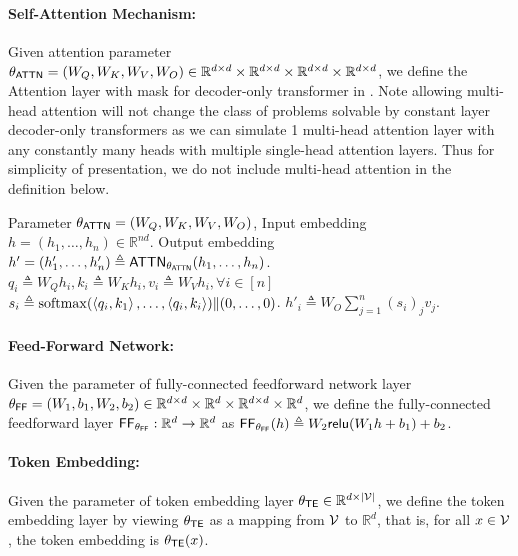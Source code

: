 \paragraph{Self-Attention Mechanism:} Given attention parameter $\theta_{\mathsf{ATTN}} = (W_Q,W_K,W_V,W_O)\in \mathbb{R}^{d\times d}\times \mathbb{R}^{d\times d}\times\mathbb{R}^{d\times d}\times \mathbb{R}^{d\times d}$, we define the Attention layer with mask for decoder-only transformer in . Note allowing multi-head attention will not change the class of problems solvable by constant layer decoder-only transformers as we can simulate 1 multi-head attention layer with any constantly many heads with multiple single-head attention layers. Thus for simplicity of presentation, we do not include multi-head attention in the definition below.

\begin{algorithm}
\caption{Causal Self-Attention, $\Attn$}\label{alg:defi_attn}
\begin{algorithmic}[1]
\Require  Parameter $\theta_{\mathsf{ATTN}} = (W_Q,W_K,W_V,W_O)$, Input embedding $h= (h_1,\ldots, h_n)\in\mathbb{R}^{nd}$.
\Ensure Output embedding $h'= (h'_1,\ldots, h'_n) \triangleq \mathsf{ATTN}_{\theta_{\mathsf{ATTN}}}(h_1,\ldots, h_n)$.
\State $q_i \triangleq W_Q  h_i, k_i \triangleq W_K h_i, v_i \triangleq W_V h_i, \forall i\in[n]$
\State $s_i \triangleq \mathrm{softmax}(\left\langle q_i,k_1 \right\rangle,\ldots,\left\langle q_i,k_i \right\rangle) \| (0,\ldots, 0) $. 
\State $h'_i \triangleq W_O \sum_{j=1}^n (s_i)_j v_j$.
\end{algorithmic}
\end{algorithm}



\paragraph{Feed-Forward Network:} Given the parameter of fully-connected feedforward network layer $\theta_{\mathsf{FF}} = (W_1,b_1,W_2,b_2)\in \mathbb{R}^{d\times d}\times \mathbb{R}^d \times \mathbb{R}^{d\times d}\times \mathbb{R}^d$, we define the fully-connected feedforward layer $\mathsf{FF}_{\theta_{\mathsf{FF}}}:\mathbb{R}^d\to \mathbb{R}^d$ as $\mathsf{FF}_{\theta_{\mathsf{FF}}}(h) \triangleq W_2\mathsf{relu}(W_1 h + b_1) + b_2$.

\paragraph{Token Embedding:} Given the parameter of token embedding layer $\theta_{\mathsf{TE}} \in \mathbb{R}^{d \times|{\mathcal{V}}|}$, we define the token embedding layer by viewing $\theta_{\mathsf{TE}}$ as a mapping from ${\mathcal{V}} $ to $ \mathbb{R}^d$, that is, for all $x\in {\mathcal{V}}$, the token embedding is $\theta_{\mathsf{TE}}(x)$. 

